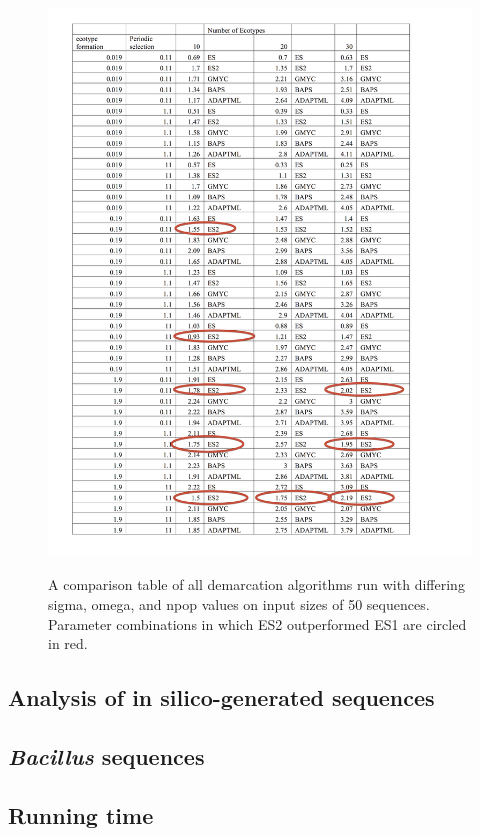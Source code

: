 \begin{figure}[h!]
  \caption[Demarcation comparison table for small inputs (nu = 50).]{A comparison table of all demarcation algorithms run with differing sigma, omega, and npop values on input sizes of 50 sequences. Parameter combinations in which ES2 outperformed ES1 are circled in red.}
  \centering
    \includegraphics{images/ComparisonTable1.png}
    \label{fig:ComparisonSmall}
\end{figure}

\subsection{Analysis of in silico-generated sequences}
\subsection{\emph{Bacillus} sequences}
\subsection{Running time}